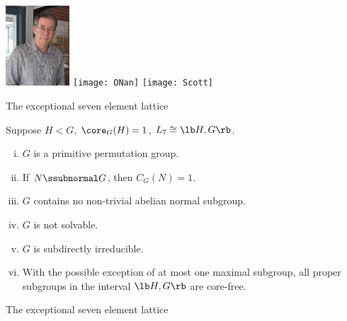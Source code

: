 \begin{frame}[fragile,label=AOS]{}
\begin{center}
\includegraphics[height=30mm]{aux/Aschbacher3}
\hskip2mm
\texttt{[image: ONan]}
\hskip2mm
\texttt{[image: Scott]}
 \end{center}

\end{frame}



\begin{frame}[fragile,label=Example7elementPreziOld,shrink=5]{The exceptional seven element lattice}
    \begin{prop}
      \label{thm:except-seven-elem}
      Suppose $H<G$, \hskip2mm $\core_G(H) = 1$, \hskip2mm $L_7 \cong \lb H,G \rb$.
      \begin{enumerate}[(i)]
      \item<1-> $G$ is a primitive permutation group.
      \item<1-> If $N\ssubnormal G$, then $C_G(N) = 1$.
      \item<1-> $G$ contains no non-trivial abelian normal subgroup.
      \item<1-> $G$ is not solvable.
      \item<1-> $G$ is subdirectly irreducible.
      \item<1-> With the possible exception of at most one maximal subgroup, %
        all proper subgroups in the interval $\lb H,G \rb$ are core-free. 
      \end{enumerate}
    \end{prop}
\end{frame}


\begin{frame}[fragile,label=Example7elementPreziBigFig]{The exceptional seven element lattice}
      \begin{center}
    {
}
      \end{center}
\end{frame}


